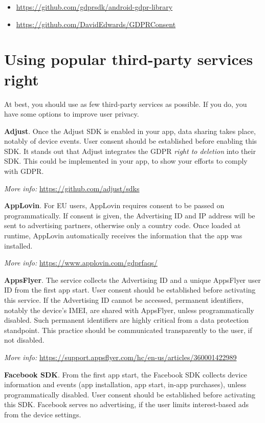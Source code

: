\documentclass[
]{book}
\providecommand{\tightlist}{%
  \setlength{\itemsep}{0pt}\setlength{\parskip}{0pt}}
\begin{document}
\begin{itemize}
\tightlist
\item
  \url{https://github.com/gdprsdk/android-gdpr-library}
\item
  \url{https://github.com/DavidEdwards/GDPRConsent}
\end{itemize}

\hypertarget{using-popular-third-party-services-right}{%
\section{Using popular third-party services right}\label{using-popular-third-party-services-right}}

At best, you should use as few third-party services as possible. If you do, you have some options to improve user privacy.

\textbf{Adjust}. Once the Adjust SDK is enabled in your app, data sharing takes place, notably of device events. User consent should be established before enabling this SDK. It stands out that Adjust integrates the GDPR \emph{right to deletion} into their SDK. This could be implemented in your app, to show your efforts to comply with GDPR.

\emph{More info:} \url{https://github.com/adjust/sdks}

\textbf{AppLovin}. For EU users, AppLovin requires consent to be passed on programmatically. If consent is given, the Advertising ID and IP address will be sent to advertising partners, otherwise only a country code. Once loaded at runtime, AppLovin automatically receives the information that the app was installed.

\emph{More info:} \url{https://www.applovin.com/gdprfaqs/}

\textbf{AppsFlyer}. The service collects the Advertising ID and a unique AppsFlyer user ID from the first app start. User consent should be established before activating this service. If the Advertising ID cannot be accessed, permanent identifiers, notably the device's IMEI, are shared with AppsFlyer, unless programmatically disabled. Such permanent identifiers are highly critical from a data protection standpoint. This practice should be communicated transparently to the user, if not disabled.

\emph{More info:} \url{https://support.appsflyer.com/hc/en-us/articles/360001422989}

\textbf{Facebook SDK}. From the first app start, the Facebook SDK collects device information and events (app installation, app start, in-app purchases), unless programmatically disabled. User consent should be established before activating this SDK. Facebook serves no advertising, if the user limits interest-based ads from the device settings.
\end{document}
